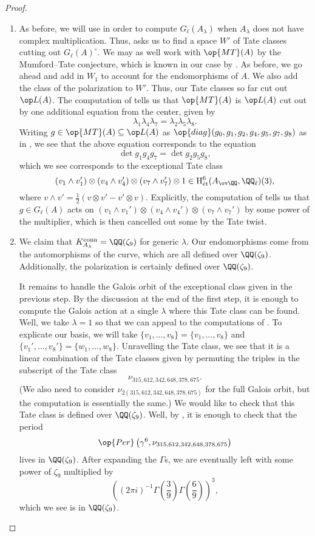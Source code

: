 \documentclass[../thesis.tex]{subfiles}
\begin{document}
\begin{proof}
\begin{enumerate}
		\item As before, we will use  in order to compute $G_\ell(A_\lambda)$ when $A_\lambda$ does not have complex multiplication. Thus,  asks us to find a space $W'$ of Tate classes cutting out $G_\ell(A)^\circ$. We may as well work with $\op{MT}(A)$ by the Mumford--Tate conjecture, which is known in our case by . As before, we go ahead and add in $W_1$ to account for the endomorphisms of $A$. We also add the class of the polarization to $W'$. Thus, our Tate classes so far cut out $\op L(A)$. The computation of  tells us that $\op{MT}(A)$ is $\op L(A)$ cut out by one additional equation from the center, given by
		\[\lambda_1\lambda_4\lambda_7=\lambda_2\lambda_5\lambda_8.\]
		Writing $g\in\op{MT}(A)\subseteq\op L(A)$ as $\op{diag}(g_0,g_1,g_2,g_4,g_5,g_7,g_8)$ as in , we see that the above equation corresponds to the equation
		\[\det g_1g_4g_7=\det g_2g_5g_8,\]
		which we see corresponds to the exceptional Tate class
		\[(v_1\land v_1')\otimes(v_4\land v_4')\otimes(v_7\land v_7')\otimes1\in\mathrm H^{6}_{\mathrm{\acute et}}(A_{\ov\QQ},\QQ_\ell)(3),\]
		where $v\land v'=\frac12(v\otimes v'-v'\otimes v)$. Explicitly, the computation of  tells us that $g\in G_\ell(A)$ acts on $(v_1\land v_1')\otimes(v_4\land v_4')\otimes(v_7\land v_7')$ by some power of the multiplier, which is then cancelled out some by the Tate twist.

		\item We claim that $K_{A_\lambda}^{\mathrm{conn}}=\QQ(\zeta_9)$ for generic $\lambda$. Our endomorphisms come from the automorphisms of the curve, which are all defined over $\QQ(\zeta_9)$. Additionally, the polarization is certainly defined over $\QQ(\zeta_9)$.
		
		It remains to handle the Galois orbit of the exceptional class given in the previous step. By the discussion at the end of the first step, it is enough to compute the Galois action at a single $\lambda$ where this Tate class can be found. Well, we take $\lambda=1$ so that we can appeal to the computations of . To explicate our basis, we will take $\{v_1,\ldots,v_8\}=\{v_1,\ldots,v_8\}$ and $\{v_1',\ldots,v_8'\}=\{w_1,\ldots,w_8\}$. Unravelling the Tate class, we see that it is a linear combination of the Tate classes given by permuting the triples in the subscript of the Tate class
		\[\nu_{315,612,342,648,378,675}.\]
		(We also need to consider $\nu_{2(315,612,342,648,378,675)}$ for the full Galois orbit, but the computation is essentially the same.) We would like to check that this Tate class is defined over $\QQ(\zeta_9)$. Well, by , it is enough to check that the period
		\[\op{Per}\left(\gamma^6,\nu_{315,612,342,648,378,675}\right)\]
		lives in $\QQ(\zeta_9)$. After expanding the $\Gamma$s, we are eventually left with some power of $\zeta_9$ multiplied by
		\[\left((2\pi i)^{-1}\Gamma\left(\frac39\right)\Gamma\left(\frac 69\right)\right)^3,\]
		which we see is in $\QQ(\zeta_9)$.
		

\end{enumerate}
\end{proof}
\end{document}
